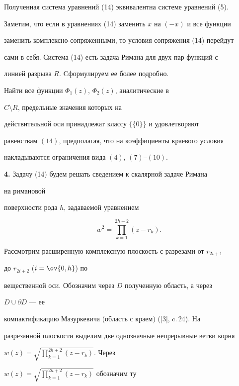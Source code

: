 Полученная система уравнений (14) эквивалентна системе уравнений (5). 


Заметим, что если в уравнениях (14) заменить $x$ на $(-x)$ и все функции 


заменить комплексно-сопряженными, то условия сопряжения (14) перейдут 


сами в себя. Система (14) есть задача Римана для двух пар функций с 


линией разрыва $R$. Cформулируем ее более подробно. 


{\it  


Найти все функции $\Phi_1(z)$, $\Phi_2(z)$, аналитические в 


$C\setminus R$, предельные значения которых на 


действительной оси принадлежат классу $\{\{0\}\}$ и удовлетворяют 


равенствам $(14)$, предполагая, что на коэффициенты краевого условия 


накладываются ограничения вида $(4)$, $(7)$--$(10)$. 


} 




 


{\bf 4.} Задачу (14) будем решать сведением к скалярной задаче Римана 


на римановой 


поверхности рода $h$, задаваемой уравнением 


\begin{equation} 


w^2=\prod^{2h+2}_{k=1}(z-r_k). 


\end{equation} 


Рассмотрим расширенную комплексную плоскость с разрезами от $r_{2i+1}$ 


до $r_{2i+2}$ ($i=\ov{0,h}$) по 


вещественной оси. Обозначим через $D$ полученную область, а через 


$D\cup\partial D$ --- ее 


компактификацию Мазуркевича (область с краем) ([3], c.\,24). На 


разрезанной плоскости выделим две однозначные непрерывные ветви корня 


$w(z)=\sqrt{\prod\limits^{2h+2}_{k=1}(z-r_k)}$. Через 


$w(z)=\sqrt{\prod\limits^{2h+2}_{k=1}(z-r_k)}$ обозначим ту 


